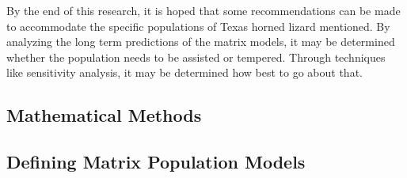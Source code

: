 \documentclass{article}
\begin{document}
    By the end of this research, it is hoped that some recommendations can be made to accommodate the specific populations of Texas horned lizard mentioned.
    By analyzing the long term predictions of the matrix models, it may be determined whether the population needs to be assisted or tempered.
    Through techniques like sensitivity analysis, it may be determined how best to go about that.

    \newpage
    \begin{center}
        \section{Mathematical Methods}\label{sec:mathematical-methods}
    \end{center}

    \subsection{Defining Matrix Population Models}\label{subsec:defining-matrix-population-models}
\end{document}
